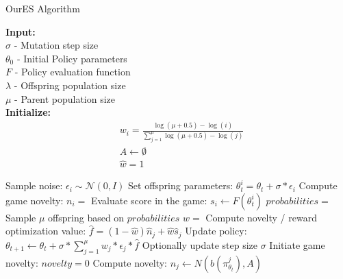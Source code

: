 \documentclass[11 pt, twocolumn]{article}
\newcommand{\algspace}{\hspace{\algorithmicindent}}
\begin{document}
\begin{algorithm}
\scriptsize
\caption{OurES Algorithm}\label{alg:our}
\hspace*{\algorithmicindent} \textbf{Input:} \\
\hspace*{\algorithmicindent} $\sigma$ - Mutation step size\\
\hspace*{\algorithmicindent} $\theta_0$ - Initial Policy parameters\\
\hspace*{\algorithmicindent} $F$ - Policy evaluation function\\
\hspace*{\algorithmicindent} $\lambda$ - Offspring population size\\
\hspace*{\algorithmicindent} $\mu$ - Parent population size\\
\hspace*{\algorithmicindent} \textbf{Initialize:}
\begin{align*}
  &w_i=\frac{\log{(\mu + 0.5)}-\log{(i)}}{\sum_{j=1}^{\mu} \log{(\mu + 0.5)}-\log{(j)}}\\
  &A\gets\emptyset\\
  &\hat{w}=1
\end{align*}
\begin{algorithmic}[1]
      		\State Sample noise: $\epsilon_i \sim \mathcal{N}(0,I)$
      		\State Set offspring parameters: $\theta_t^i=\theta_t+\sigma*\epsilon_i$
      		\State Compute game novelty:
      		\Statex \algspace\algspace\algspace\algspace$n_i=$
      		\State Evaluate score in the game: $s_i \gets F(\theta_t^i)$
  		\EndFor
  		\State $probabilities=$
  		\Statex\algspace{}
      	\State Sample $\mu$ offspring based on $probabilities$
      	\State $\hat{w}=$ 
      	\State Compute novelty / reward optimization value:
      	\Statex\algspace\algspace\algspace$\hat{f}=(1-\hat{w})\hat{n}_j+\hat{w}\hat{s}_j$
      	\State Update policy: $\theta_{t+1} \gets \theta_t + \sigma * \sum_{j=1}^{\mu} w_j*\epsilon_j*\hat{f}$
      	\State Optionally update step size $\sigma$
  	\EndFor
\EndProcedure
\Statex
{}
	\State Initiate game novelty: $novelty=0$
	  	\State Compute novelty: $n_j\gets N(b(\pi_{\theta_t}^j), A)$

\end{algorithmic}
\end{algorithm}
\end{document}
